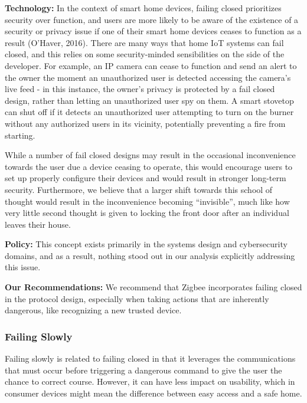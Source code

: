 {\bf Technology:} In the context of smart home devices, failing closed prioritizes security over function, and users are more likely to be aware of the existence of a security or privacy issue if one of their smart home devices ceases to function as a result (O’Haver, 2016). There are many ways that home IoT systems can fail closed, and this relies on some security-minded sensibilities on the side of the developer. For example, an IP camera can cease to function and send an alert to the owner the moment an unauthorized user is detected accessing the camera’s live feed - in this instance, the owner’s privacy is protected by a fail closed design, rather than letting an unauthorized user spy on them. A smart stovetop can shut off if it detects an unauthorized user attempting to turn on the burner without any authorized users in its vicinity, potentially preventing a fire from starting.

While a number of fail closed designs may result in the occasional inconvenience towards the user due a device ceasing to operate, this would encourage users to set up properly configure their devices and would result in stronger long-term security. Furthermore, we believe that a larger shift towards this school of thought would result in the inconvenience becoming “invisible”, much like how very little second thought is given to locking the front door after an individual leaves their house.

{\bf Policy:} This concept exists primarily in the systems design and cybersecurity domains, and as a result, nothing stood out in our analysis explicitly addressing this issue.

{\bf Our Recommendations:} We recommend that Zigbee incorporates failing closed in the protocol design, especially when taking actions that are inherently dangerous, like recognizing a new trusted device. 

\subsubsection{Failing Slowly}
Failing slowly is related to failing closed in that it leverages the communications that must occur before triggering a dangerous command to give the user the chance to correct course. However, it can have less impact on usability, which in consumer devices might mean the difference between easy access and a safe home.


